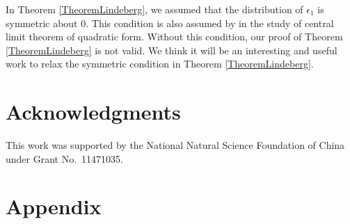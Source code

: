 \documentclass[11pt]{article}
\theoremstyle{plain}
\theoremstyle{definition}
\theoremstyle{remark}
\begin{document}
In Theorem \ref{TheoremLindeberg}, we assumed that the distribution of $\epsilon_1$ is symmetric about $0$. 
This condition is also assumed by \cite{Bai2017} in the study of central limit theorem of quadratic form.
Without this condition, our proof of Theorem \ref{TheoremLindeberg} is not valid.
We think it will be an interesting and useful work to relax the symmetric condition in Theorem \ref{TheoremLindeberg}.



\section*{Acknowledgments}
This work was supported by the National Natural Science Foundation of China under Grant No.\ 11471035.





\appendix
\section*{Appendix}
\end{document}
